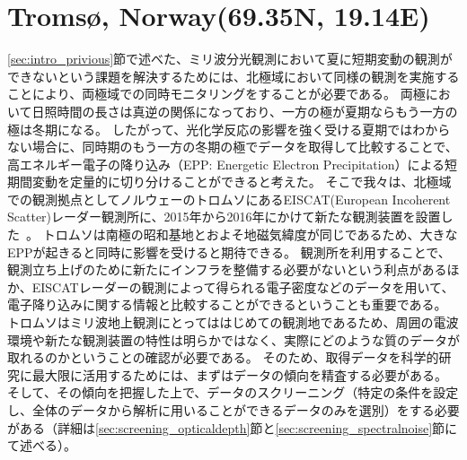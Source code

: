 \section{Troms\o , Norway(69.35\textdegree N, 19.14\textdegree E)}
\label{sec:mm_tromsoe}
\ref{sec:intro_privious}節で述べた、ミリ波分光観測において夏に短期変動の観測ができないという課題を解決するためには、北極域において同様の観測を実施することにより、両極域での同時モニタリングをすることが必要である。
両極において日照時間の長さは真逆の関係になっており、一方の極が夏期ならもう一方の極は冬期になる。
したがって、光化学反応の影響を強く受ける夏期ではわからない場合に、同時期のもう一方の冬期の極でデータを取得して比較することで、高エネルギー電子の降り込み（EPP: Energetic Electron Precipitation）による短期間変動を定量的に切り分けることができると考えた。
そこで我々は、北極域での観測拠点としてノルウェーのトロムソにあるEISCAT(European Incoherent Scatter)レーダー観測所に、2015年から2016年にかけて新たな観測装置を設置した~\cite{ito2017master}。
トロムソは南極の昭和基地とおよそ地磁気緯度が同じであるため、大きなEPPが起きると同時に影響を受けると期待できる。
観測所を利用することで、観測立ち上げのために新たにインフラを整備する必要がないという利点があるほか、EISCATレーダーの観測によって得られる電子密度などのデータを用いて、電子降り込みに関する情報と比較することができるということも重要である。
トロムソはミリ波地上観測にとってははじめての観測地であるため、周囲の電波環境や新たな観測装置の特性は明らかではなく、実際にどのような質のデータが取れるのかということの確認が必要である。
そのため、取得データを科学的研究に最大限に活用するためには、まずはデータの傾向を精査する必要がある。
そして、その傾向を把握した上で、データのスクリーニング（特定の条件を設定し、全体のデータから解析に用いることができるデータのみを選別）をする必要がある（詳細は\ref{sec:screening_opticaldepth}節と\ref{sec:screening_spectralnoise}節にて述べる）。


